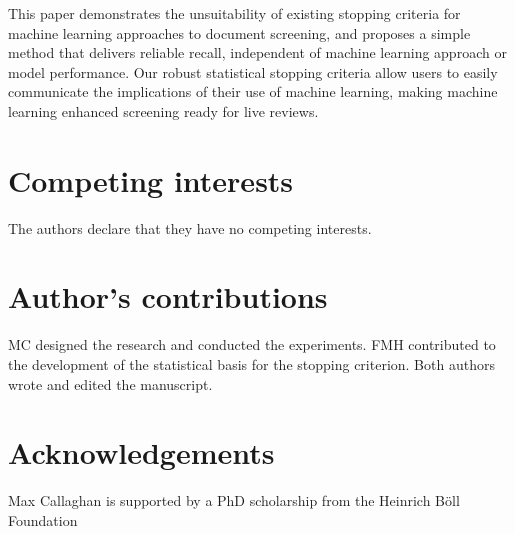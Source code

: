 \documentclass{bmcart}
\begin{document}
	This paper demonstrates the unsuitability of existing stopping criteria for machine learning approaches to document screening, and proposes a simple method that delivers reliable recall, independent of machine learning approach or model performance. Our robust statistical stopping criteria allow users to easily communicate the implications of their use of machine learning, making machine learning enhanced screening ready for live reviews.
	
	
\begin{backmatter}
	
	\section*{Competing interests}
	The authors declare that they have no competing interests.
	
	\section*{Author's contributions}
	MC designed the research and conducted the experiments. FMH contributed to the development of the statistical basis for the stopping criterion. Both authors wrote and edited the manuscript.
	
	\section*{Acknowledgements}
	Max Callaghan is supported by a PhD scholarship from the Heinrich Böll Foundation
		
	
	
	
\end{backmatter}
\end{document}
